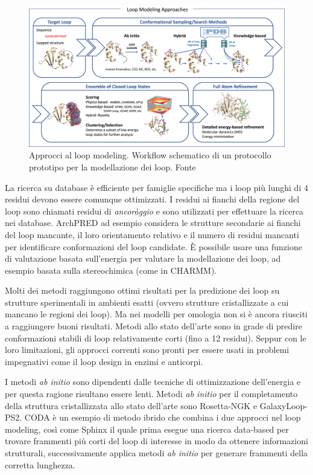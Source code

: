 {\begin{figure}[!htb]
	\centering
	\includegraphics[scale=1]{images/loop-modeling-approaches.jpg}
	\caption{Approcci al loop modeling. Workflow schematico di un protocollo prototipo per la modellazione dei loop. Fonte\cite{barozet2021current}}
	\label{fig:loop-modeling-approaches}
\end{figure}

La ricerca su database è efficiente per famiglie specifiche ma i loop più lunghi di 4 residui devono essere comunque ottimizzati. I residui ai fianchi della regione del loop sono chiamati residui di \textit{ancoràggio} e sono utilizzati per effettuare la ricerca nei database. ArchPRED ad esempio considera le strutture secondarie ai fianchi del loop mancante, il loro orientamento relativo e il numero di residui mancanti per identificare conformazioni del loop candidate. È possibile usare una funzione di valutazione basata sull'energia per valutare la modellazione dei loop, ad esempio basata sulla stereochimica (come in CHARMM). 

\par Molti dei metodi raggiungono ottimi risultati per la predizione dei loop su strutture sperimentali in ambienti esatti (ovvero strutture cristallizzate a cui mancano le regioni dei loop). Ma nei modelli per omologia non si è ancora riusciti a raggiungere buoni risultati\supercite{karami2018dareus}. Metodi allo stato dell'arte sono in grade di predire conformazioni stabili di loop relativamente corti (fino a 12 residui)\supercite{barozet2021current}.
Seppur con le loro limitazioni, gli approcci correnti sono pronti per essere usati in problemi impegnativi come il loop design in enzimi e anticorpi.

\par I metodi \textit{ab initio} sono dipendenti dalle tecniche di ottimizzazione dell'energia e per questa ragione risultano essere lenti. Metodi \textit{ab initio} per il completamento della struttura cristallizzata allo stato dell'arte sono Rosetta-NGK e GalaxyLoop-PS2. CODA è un esempio di metodo ibrido che combina i due approcci nel loop modeling, così come Sphinx il quale prima esegue una ricerca data-based per trovare frammenti più corti del loop di interesse in modo da ottenere informazioni strutturali, successivamente applica metodi \textit{ab initio} per generare frammenti della corretta lunghezza. \\

}
